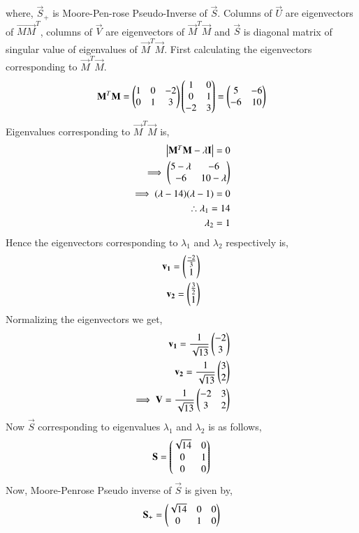 \documentclass[journal,12pt,twocolumn]{IEEEtran}
\begin{document}
where, $\vec{S}_+$ is Moore-Pen-rose Pseudo-Inverse of $\vec{S}$. Columns of $\vec{U}$ are eigenvectors of $\vec{MM}^T$, columns of $\vec{V}$ are eigenvectors of $\vec{M}^T\vec{M}$ and $\vec{S}$ is diagonal matrix of singular value of eigenvalues of $\vec{M}^T\vec{M}$. First calculating the eigenvectors corresponding to $\vec{M}^T\vec{M}$.
\begin{align}
\mathbf{M}^T\mathbf{M} =  \begin{pmatrix}1&0&-2\\0&1&3\end{pmatrix} \begin{pmatrix}1&0\\0&1\\-2&3\end{pmatrix} = \begin{pmatrix}5&-6\\-6&10\end{pmatrix}
\end{align}
Eigenvalues corresponding to $\vec{M}^T\vec{M}$  is,
\begin{align}
\begin{vmatrix}\mathbf{M}^T\mathbf{M}-\lambda\mathbf{I}\end{vmatrix} = 0\\
\implies \begin{pmatrix}5-\lambda&-6\\-6&10-\lambda\end{pmatrix}\\
\implies (\lambda-14)(\lambda-1) = 0\\
\therefore \lambda_1 = 14 \label{lambda1}\\ 
\lambda_2 = 1\label{lambda2}
\end{align} 
Hence the eigenvectors corresponding to $\lambda_1$ and $\lambda_2$ respectively is,
\begin{align}
\mathbf{v_1} =\begin{pmatrix}\frac{-2}{3}\\1\end{pmatrix}\\
\mathbf{v_2} =\begin{pmatrix}\frac{3}{2}\\1\end{pmatrix}
\end{align}
Normalizing the eigenvectors we get,
\begin{align}
\mathbf{v_1} = \frac{1}{\sqrt{13}}\begin{pmatrix}-2\\3\end{pmatrix}\\
\mathbf{v_2} = \frac{1}{\sqrt{13}}\begin{pmatrix}3\\2\end{pmatrix}\\
\implies \mathbf{V} = \frac{1}{\sqrt{13}}\begin{pmatrix}-2&3\\3&2\end{pmatrix}\label{V}
\end{align}
Now $\vec{S}$ corresponding to eigenvalues $\lambda_1$ and $\lambda_2$ is as follows,
\begin{align}
\mathbf{S} = \begin{pmatrix}\sqrt{14}&0\\0&1\\0&0\end{pmatrix}
\end{align}
Now, Moore-Penrose Pseudo inverse of $\vec{S}$ is given by,
\begin{align}
\mathbf{S}_+ = \begin{pmatrix}\sqrt{14}&0&0\\0&1&0\end{pmatrix}\label{S+}
\end{align}
\end{document}
